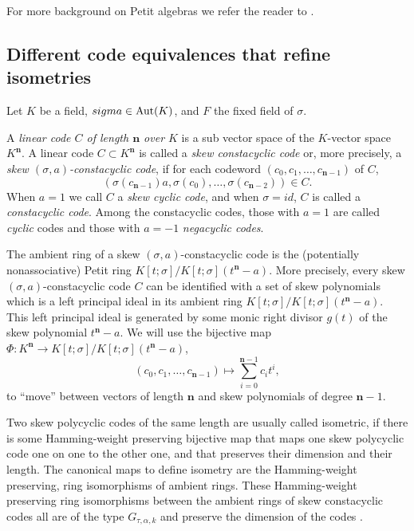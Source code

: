 \documentclass[11pt]{amsart}
\theoremstyle{plain}
\theoremstyle{definition}
\numberwithin{equation}{section}
\numberwithin{figure}{section}
\newcommand{\de}{{\mathbf{n}}}  %
\begin{document}
For more background on Petit algebras we refer the reader to \cite{Pumpluen2025, Petit1967}.



\subsection{Different code equivalences that refine isometries}\label{subsec:codes}

Let $K$ be a field, $\\sigma\in {\rm Aut}(K)$, and $F$ the fixed field
of $\sigma$.

A \emph{linear code $C$ of length $\de$ over $K$} is a  sub vector space of the $K$-vector space $K^\de$.  A linear code $C\subset K^{\de}$ is called a  \emph{skew  constacyclic code} or, more precisely, a \emph{skew  $(\sigma, a)$-constacyclic code}, if for each codeword  $(c_0,c_1,\ldots, c_{\de-1})$ of $C$,
$$(\sigma(c_{\de-1})a,\sigma(c_0),\dots,\sigma(c_{\de-2}))\in  C.$$
When $a=1$ we call $C$ a \emph{skew cyclic code}, and when $\sigma=id$, $C$
 is called a \emph{constacyclic code}. Among the constacyclic codes, those with $a=1$ are called \emph{cyclic} codes and those with $a=-1$ \emph{negacyclic codes}.

 The ambient ring of a skew  $(\sigma, a)$-constacyclic code is the (potentially nonassociative) Petit ring $K[t;\sigma]/K[t;\sigma](t^\de-a)$. More precisely, every  skew  $(\sigma, a)$-constacyclic code $C$ can be identified with  a set of skew polynomials which is a left principal ideal in its ambient ring $K[t;\sigma]/K[t;\sigma](t^\de-a)$. This left principal ideal is generated by some monic right divisor $g(t) $ of the skew polynomial $t^\de-a$. We will use the bijective map $\Phi:K^{\de}\rightarrow K[t;\sigma]/K[t;\sigma](t^\de-a)$,
$$(c_0,c_1,\dots,c_{\de-1})\mapsto \sum_{i=0}^{\de-1}c_it^i,$$
to ``move'' between vectors  of length $\de$  and skew polynomials of degree ${\de}-1$.

Two skew polycyclic codes of the same length are usually called  isometric, if there is some Hamming-weight preserving bijective map that maps  one skew polycyclic code one on one to the other one, and  that preserves their dimension and  their length. The canonical maps to define isometry are the Hamming-weight preserving, ring isomorphisms of ambient rings. These Hamming-weight preserving ring isomorphisms between the ambient rings of skew constacyclic codes all are of the type $G_{\tau,\alpha,k}$ and preserve the dimension of the codes \cite[Section 2]{Pumpluen2025}.
\end{document}
